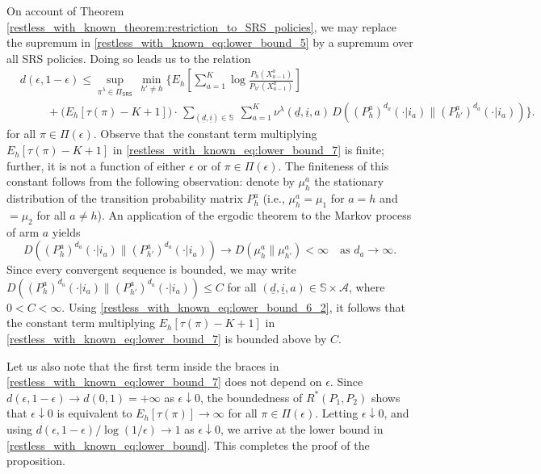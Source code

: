 On account of Theorem \ref{restless_with_known_theorem:restriction_to_SRS_policies}, we may replace the supremum in \eqref{restless_with_known_eq:lower_bound_5} by a supremum over all SRS policies. Doing so leads us to the relation
\begin{align}
	&d(\epsilon,1-\epsilon)\leq \sup\limits_{\pi^\lambda\in \Pi_{\textsf{SRS}}}\,\min\limits_{h'\neq h}\bigg\lbrace E_h\left[\sum\limits_{a=1}^{K} \log\frac{P_h(X_{a-1}^a)}{P_{h'}(X_{a-1}^a)}\right]\nonumber\\
	&\hspace{1cm}+\bigg(E_h[\tau(\pi)-K+1]\bigg)\cdot\,\sum\limits_{(\underline{d},\underline{i})\in\mathbb{S}}~\sum\limits_{a=1}^{K}\nu^\lambda(\underline{d},\underline{i},a)\, D((P_h^a)^{d_a}(\cdot|i_a)\|(P_{h'}^a)^{d_a}(\cdot|i_a))\bigg\rbrace.\label{restless_with_known_eq:lower_bound_7}
\end{align}
for all $\pi\in\Pi(\epsilon)$. Observe that the constant term multiplying $E_h[\tau(\pi)-K+1]$ in \eqref{restless_with_known_eq:lower_bound_7} is finite; further, it is not a function of either $\epsilon$ or of $\pi\in\Pi(\epsilon)$. The finiteness of this constant follows from the following observation: denote by $\mu_h^a$ the stationary distribution of the transition probability matrix $P_h^a$ (i.e., $\mu_h^a=\mu_1$ for $a=h$ and $=\mu_2$ for all $a\neq h$). An application of the ergodic theorem to the Markov process of arm $a$ yields 
	    \begin{equation}
	    	D((P_h^a)^{d_a}(\cdot|i_a)\|(P_{h'}^a)^{d_a}(\cdot|i_a))\longrightarrow D(\mu_h^a\|\mu_{h'}^a)<\infty \quad \text{as }d_a\to\infty.
	    \end{equation}
	    Since every convergent sequence is bounded, we may write $D((P_h^a)^{d_a}(\cdot|i_a)\|(P_{h'}^a)^{d_a}(\cdot|i_a))\leq C$ for all $(\underline{d},\underline{i},a)\in\mathbb{S}\times\mathcal{A}$, where $0<C<\infty$. Using \eqref{restless_with_known_eq:lower_bound_6_2}, it follows that the constant term multiplying $E_h[\tau(\pi)-K+1]$ in \eqref{restless_with_known_eq:lower_bound_7} is bounded above by $C$.
	    
Let us also note that the first term inside the braces in \eqref{restless_with_known_eq:lower_bound_7} does not depend on $\epsilon$. Since $d(\epsilon,1-\epsilon)\to d(0,1)=+\infty$ as $\epsilon\downarrow 0$, the boundedness of $R^*(P_1,P_2)$ shows that $\epsilon\downarrow 0$ is equivalent to $E_h[\tau(\pi)]\to \infty$ for all $\pi\in\Pi(\epsilon)$.
Letting $\epsilon\downarrow 0$, and using  $d(\epsilon,1-\epsilon)/\log(1/\epsilon)\longrightarrow 1$ as $\epsilon\downarrow 0$, we arrive at the lower bound in \eqref{restless_with_known_eq:lower_bound}. This completes the proof of the proposition.

